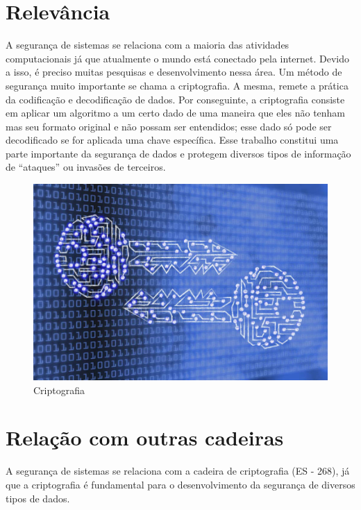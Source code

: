 \documentclass[a4paper, 10pt]{article}
\begin{document}
\section{Relevância}
A segurança de sistemas se relaciona com a maioria das atividades computacionais já que atualmente o mundo está conectado pela internet. Devido a isso, é preciso muitas pesquisas e desenvolvimento nessa área. Um método de segurança muito importante se chama a criptografia. A mesma, remete a prática da codificação e decodificação de dados. Por conseguinte, a criptografia consiste em aplicar um algoritmo a um certo dado de uma maneira que eles não tenham mas seu formato original e não possam ser entendidos; esse dado só pode ser decodificado se for aplicada uma chave específica. 
Esse trabalho constitui uma parte importante da segurança de dados e protegem diversos tipos de informação de “ataques” ou invasões de terceiros.
\citep{criptografia}

\begin{figure}[h!]
\centering
\includegraphics[scale=0.23]{cripto.jpg}
\caption{Criptografia \citep{imagemcripto}}
\label{Criptografia}
\end{figure}

\section{Relação com outras cadeiras}
A segurança de sistemas se relaciona com a cadeira de criptografia (ES - 268), já que a criptografia é fundamental para o desenvolvimento da segurança de diversos tipos de dados.





\end{document}
